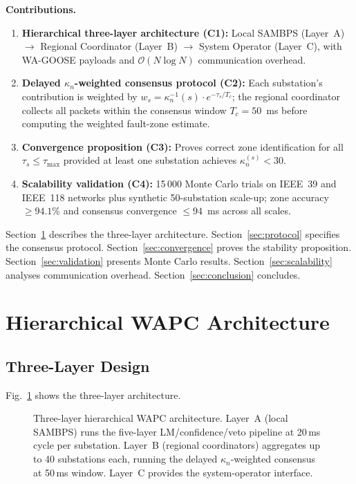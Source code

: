 \documentclass[journal]{IEEEtran}
\newcommand{\kappan}{\kappa_n}
\newcommand{\Tc}{T_c}
\newcommand{\taumax}{\tau_{\max}}
\begin{document}
\textbf{Contributions.}
\begin{enumerate}[(C1)]
  \item \textbf{Hierarchical three-layer architecture (C1):}
        Local SAMBPS (Layer~A) $\to$ Regional Coordinator (Layer~B)
        $\to$ System Operator (Layer~C), with WA-GOOSE payloads and
        $\mathcal{O}(N\log N)$ communication overhead.
  \item \textbf{Delayed $\kappan$-weighted consensus protocol (C2):}
        Each substation's contribution is weighted by $w_s =
        \kappan^{-1}(s) \cdot e^{-\tau_s/\Tc}$; the regional coordinator
        collects all packets within the consensus window $\Tc = 50$~ms
        before computing the weighted fault-zone estimate.
  \item \textbf{Convergence proposition (C3):}
        Proves correct zone identification for all $\tau_s \leq \taumax$
        provided at least one substation achieves $\kappan^{(s)} < 30$.
  \item \textbf{Scalability validation (C4):}
        15\,000 Monte Carlo trials on IEEE~39 and IEEE~118 networks plus
        synthetic 50-substation scale-up; zone accuracy $\geq 94.1\%$ and
        consensus convergence $\leq 94$~ms across all scales.
\end{enumerate}

Section~\ref{sec:architecture} describes the three-layer architecture.
Section~\ref{sec:protocol} specifies the consensus protocol.
Section~\ref{sec:convergence} proves the stability proposition.
Section~\ref{sec:validation} presents Monte Carlo results.
Section~\ref{sec:scalability} analyses communication overhead.
Section~\ref{sec:conclusion} concludes.

\section{Hierarchical WAPC Architecture}
\label{sec:architecture}

\subsection{Three-Layer Design}

Fig.~\ref{fig:hierarchy} shows the three-layer architecture.

\begin{figure}[htbp]
  \centering
  
  \caption{Three-layer hierarchical WAPC architecture.  Layer~A (local
           SAMBPS) runs the five-layer LM/confidence/veto pipeline at
           20\,ms cycle per substation.  Layer~B (regional coordinators)
           aggregates up to 40 substations each, running the delayed
           $\kappan$-weighted consensus at 50\,ms window.  Layer~C
           provides the system-operator interface.}
  \label{fig:hierarchy}
\end{figure}
\end{document}
